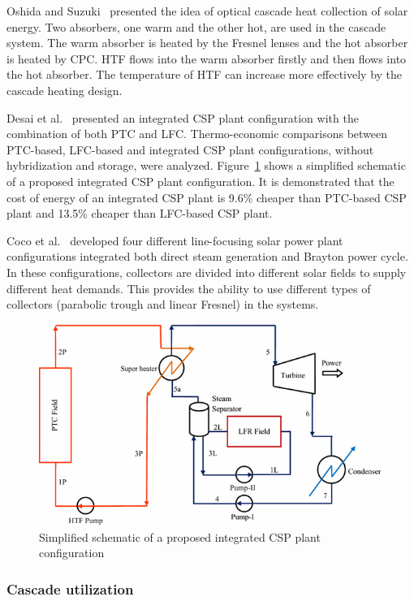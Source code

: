 Oshida and Suzuki~\cite{Oshida1987} presented the idea of optical cascade heat collection of solar energy. Two absorbers, one warm and the other hot, are used in the cascade system. The warm absorber is heated by the Fresnel lenses and the hot absorber is heated by CPC. HTF flows into the warm absorber firstly and then flows into the hot absorber. The temperature of HTF can increase more effectively by the cascade heating design.

Desai et al.~\cite{Desai2015} presented an integrated CSP plant configuration with the combination of both PTC and LFC. Thermo-economic comparisons between PTC-based, LFC-based and integrated CSP plant configurations, without hybridization and storage, were analyzed. Figure~\ref{fig:Desai2015} shows a simplified schematic of a proposed integrated CSP plant configuration. It is demonstrated that the cost of energy of an integrated CSP plant is 9.6\% cheaper than PTC-based CSP plant and 13.5\% cheaper than LFC-based CSP plant.

Coco et al.~\cite{Coco2015} developed four different line-focusing solar power plant configurations integrated both direct steam generation and Brayton power cycle. In these configurations, collectors are divided into different solar fields to supply different heat demands. This provides the ability to use different types of collectors (parabolic trough and linear Fresnel) in the systems.

\begin{figure}[!ht]
\centering
\includegraphics[width=.7\textwidth]{fig/Desai2015.jpg}
\caption{Simplified schematic of a proposed integrated CSP plant configuration}\label{fig:Desai2015}
\end{figure}


\subsubsection{Cascade utilization}


